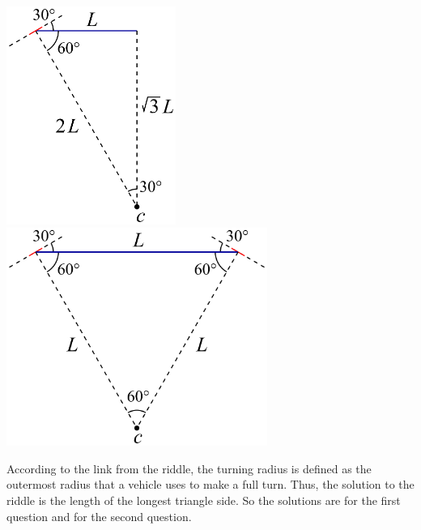 \documentclass{article}
\begin{document}
\vspace{0.2in}
\begin{center}
\includegraphics[height=2.8in]{turning_1.png}
\hspace{0.6in}
\includegraphics[height=2.8in]{turning_2.png}
\end{center}
\vspace{0.2in}

According to the link from the riddle, the turning radius is defined as the outermost radius that a vehicle uses to make a full turn.
Thus, the solution to the riddle is the length of the longest triangle side.
So the solutions are
 for the first question and
 for the second question.
\end{document}
